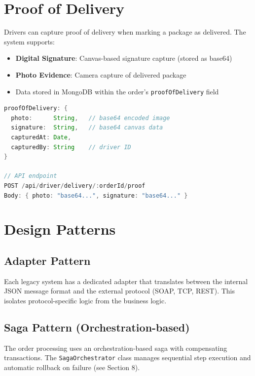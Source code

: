 \documentclass[12pt,a4paper]{article}
\begin{document}
\section{Proof of Delivery}

Drivers can capture proof of delivery when marking a package as delivered. The system supports:

\begin{itemize}
  \item \textbf{Digital Signature}: Canvas-based signature capture (stored as base64)
  \item \textbf{Photo Evidence}: Camera capture of delivered package
  \item Data stored in MongoDB within the order's \texttt{proofOfDelivery} field
\end{itemize}

\begin{lstlisting}[language=java, caption={Proof of Delivery Schema}]
proofOfDelivery: {
  photo:      String,   // base64 encoded image
  signature:  String,   // base64 canvas data
  capturedAt: Date,
  capturedBy: String    // driver ID
}

// API endpoint
POST /api/driver/delivery/:orderId/proof
Body: { photo: "base64...", signature: "base64..." }
\end{lstlisting}

\section{Design Patterns}

\subsection{Adapter Pattern}
Each legacy system has a dedicated adapter that translates between the internal JSON message format and the external protocol (SOAP, TCP, REST). This isolates protocol-specific logic from the business logic.

\subsection{Saga Pattern (Orchestration-based)}
The order processing uses an orchestration-based saga with compensating transactions. The \texttt{SagaOrchestrator} class manages sequential step execution and automatic rollback on failure (see Section 8).
\end{document}
